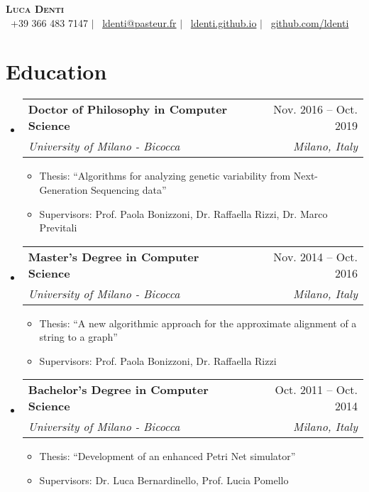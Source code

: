 \documentclass[letterpaper,11pt]{article}
\makeatletter
\newcommand{\resumeItem}[1]{
  \item\small{
    {#1 \vspace{-2pt}}
  }
}
\newcommand{\resumeSubheading}[4]{
  \vspace{-2pt}\item
    \begin{tabular*}{0.97\textwidth}[t]{l@{\extracolsep{\fill}}r}
      \textbf{#1} & #2 \\
      \textit{\small#3} & \textit{\small #4} \\
    \end{tabular*}\vspace{-7pt}
}
\newcommand{\resumeSubHeadingListStart}{\begin{itemize}[leftmargin=0.15in, label={}]}
\newcommand{\resumeSubHeadingListEnd}{\end{itemize}}
\newcommand{\resumeItemListStart}{\begin{itemize}}
\newcommand{\resumeItemListEnd}{\end{itemize}\vspace{-5pt}}
\makeatother
\begin{document}

\begin{center}
    \textbf{\Huge \scshape Luca Denti} \\ \vspace{1pt}
    \small \faMobile~+39 366 483 7147 $|$
    \Letter~\href{mailto:ldenti@pasteur.fr}{ldenti@pasteur.fr} $|$
    \faHome~\href{https://ldenti.github.io}{ldenti.github.io} $|$
    \faGithub~\href{https://github.com/ldenti}{github.com/ldenti}
\end{center}


\section{Education}
  \resumeSubHeadingListStart
    \resumeSubheading
      {Doctor of Philosophy in Computer Science}{Nov. 2016 -- Oct. 2019}
      {University of Milano - Bicocca}{Milano, Italy}
      \resumeItemListStart
      \resumeItem{Thesis: ``Algorithms for analyzing genetic variability from Next-Generation Sequencing data''}
      \resumeItem{Supervisors: Prof. Paola Bonizzoni, Dr. Raffaella Rizzi, Dr. Marco Previtali}
      \resumeItemListEnd
    \resumeSubheading
      {Master's Degree in Computer Science}{Nov. 2014 -- Oct. 2016}
      {University of Milano - Bicocca}{Milano, Italy}
      \resumeItemListStart
      \resumeItem{Thesis: ``A new algorithmic approach for the approximate alignment of a string to a graph''}
      \resumeItem{Supervisors: Prof. Paola Bonizzoni, Dr. Raffaella Rizzi}
      \resumeItemListEnd
    \resumeSubheading
      {Bachelor's Degree in Computer Science}{Oct. 2011 -- Oct. 2014}
      {University of Milano - Bicocca}{Milano, Italy}
      \resumeItemListStart
      \resumeItem{Thesis: ``Development of an enhanced Petri Net simulator''}
      \resumeItem{Supervisors: Dr. Luca Bernardinello, Prof. Lucia Pomello}
      \resumeItemListEnd
  \resumeSubHeadingListEnd
\end{document}
